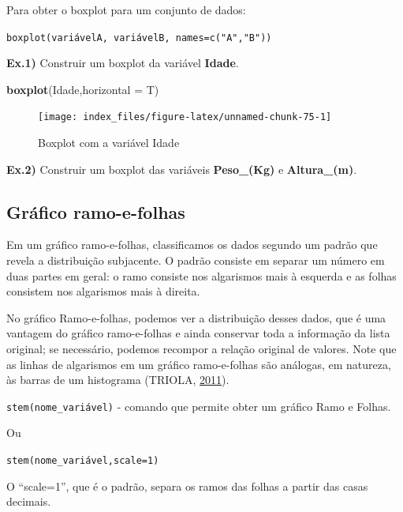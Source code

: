 \documentclass[12pt,brazil,oneside]{book}
\newenvironment{Shaded}{\begin{snugshade}}{\end{snugshade}}
\newcommand{\DataTypeTok}[1]{\textcolor[rgb]{0.13,0.29,0.53}{#1}}
\newcommand{\KeywordTok}[1]{\textcolor[rgb]{0.13,0.29,0.53}{\textbf{#1}}}
\newcommand{\NormalTok}[1]{#1}
\begin{document}
Para obter o boxplot para um conjunto de dados:

\texttt{boxplot(variávelA,\ variávelB,\ names=c("A","B"))}

\textbf{Ex.1)} Construir um boxplot da variável \textbf{Idade}.

\begin{Shaded}
\begin{Highlighting}[]
\KeywordTok{boxplot}\NormalTok{(Idade,}\DataTypeTok{horizontal =}\NormalTok{ T)}
\end{Highlighting}
\end{Shaded}

\begin{figure}[H]

{\centering \texttt{[image: index\_files/figure-latex/unnamed-chunk-75-1]} 

}

\caption{Boxplot com a variável Idade}\label{fig:unnamed-chunk-75}
\end{figure}

\textbf{Ex.2)} Construir um boxplot das variáveis \textbf{Peso\_(Kg)} e
\textbf{Altura\_(m)}.

\hypertarget{grafico-ramo-e-folhas}{%
\subsection{Gráfico ramo-e-folhas}\label{grafico-ramo-e-folhas}}

Em um gráfico ramo-e-folhas, classificamos os dados segundo um padrão
que revela a distribuição subjacente. O padrão consiste em separar um
número em duas partes em geral: o ramo consiste nos algarismos mais à
esquerda e as folhas consistem nos algarismos mais à direita.

No gráfico Ramo-e-folhas, podemos ver a distribuição desses dados, que é
uma vantagem do gráfico ramo-e-folhas e ainda conservar toda a
informação da lista original; se necessário, podemos recompor a relação
original de valores. Note que as linhas de algarismos em um gráfico
ramo-e-folhas são análogas, em natureza, às barras de um histograma
(TRIOLA, \protect\hyperlink{ref-triola1999}{2011}).

\texttt{stem(nome\_variável)} - comando que permite obter um gráfico
Ramo e Folhas.

Ou

\texttt{stem(nome\_variável,scale=1)}

O ``scale=1'', que é o padrão, separa os ramos das folhas a partir das
casas decimais.
\end{document}
